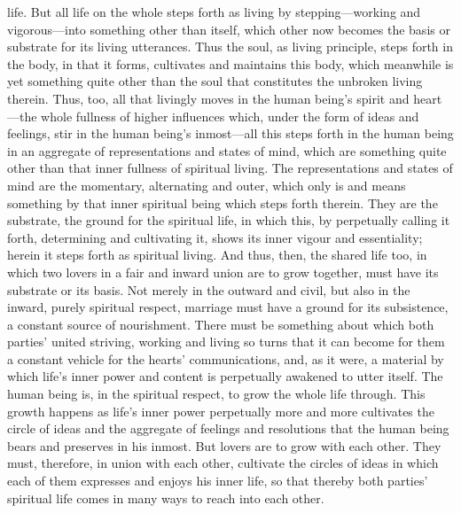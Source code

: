 \documentclass[12pt,a4paper]{book}
\begin{document}
life. But all life on the whole steps forth as living by stepping---working
and vigorous---into something other than itself, which other now becomes
the basis or substrate for its living utterances. Thus the soul, as living
principle, steps forth in the body, in that it forms, cultivates and
maintains this body, which meanwhile is yet something quite other than the
soul that constitutes the unbroken living therein. Thus, too, all that
livingly moves in the human being's spirit and heart---the whole fullness
of higher influences which, under the form of ideas and feelings, stir in
the human being's inmost---all this steps forth in the human being in an
aggregate of representations and states of mind, which are something quite
other than that inner fullness of spiritual living. The representations and
states of mind are the momentary, alternating and outer, which only is and
means something by that inner spiritual being which steps forth therein.
They are the substrate, the ground for the spiritual life, in which this,
by perpetually calling it forth, determining and cultivating it, shows its
inner vigour and essentiality; herein it steps forth as spiritual living.
And thus, then, the shared life too, in which two lovers in a fair and
inward union are to grow together, must have its substrate or its basis.
Not merely in the outward and civil, but also in the inward, purely
spiritual respect, marriage must have a ground for its subsistence, a
constant source of nourishment. There must be something about which both
parties' united striving, working and living so turns that it can become
for them a constant vehicle for the hearts' communications, and, as it
were, a material by which life's inner power and content is perpetually
awakened to utter itself. The human being is, in the spiritual respect, to
grow the whole life through. This growth happens as life's inner power
perpetually more and more cultivates the circle of ideas and the aggregate
of feelings and resolutions that the human being bears and preserves in his
inmost. But lovers are to grow with each other. They must, therefore, in
union with each other, cultivate the circles of ideas in which each of them
expresses and enjoys his inner life, so that thereby both parties'
spiritual life comes in many ways to reach into each other.
\end{document}
